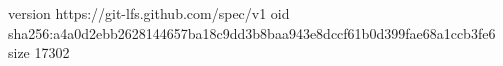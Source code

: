 version https://git-lfs.github.com/spec/v1
oid sha256:a4a0d2ebb2628144657ba18c9dd3b8baa943e8dccf61b0d399fae68a1ccb3fe6
size 17302
